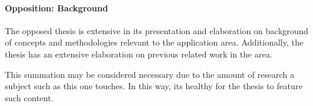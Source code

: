 
\paragraph{Opposition: Background}
\label{par:oppositionbackground}
The opposed thesis is extensive in its presentation and elaboration on background of concepts and methodologies relevant to the application area.
Additionally, the thesis has an extensive elaboration on previous related work in the area.

This summation may be considered necessary due to the amount of research a subject such as this one touches.
In this way, its healthy for the thesis to feature such content.